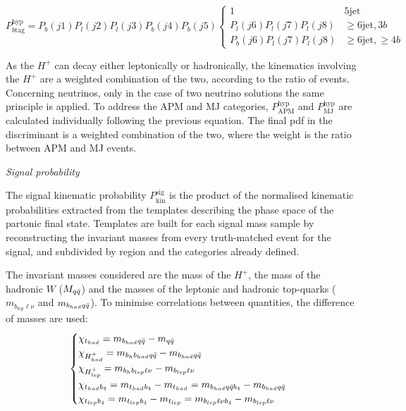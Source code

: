 \begin{equation}
    P^{\text{hyp}}_{b\text{tag}}=P_b(j1)P_l(j2)P_l(j3)P_b(j4)P_b(j5)\begin{cases}1&5\text{jet}\\P_l(j6)P_l(j7)P_l(j8)& \geq6\text{jet},3b\\P_b(j6)P_l(j7)P_l(j8)&\geq6\text{jet},\geq4b\end{cases}
\end{equation}

As the $H^+$ can decay either leptonically or hadronically, the kinematics involving the $H^+$ are a weighted combination of the two, according to the ratio of events. Concerning neutrinos, only in the case of two neutrino solutions the same principle is applied. To address the APM and MJ categories, $P^{\text{hyp}}_{\text{APM}}$ and $P^{\text{hyp}}_{\text{MJ}}$ are calculated individually following the previous equation. The final pdf in the discriminant is a weighted combination of the two, where the weight is the ratio between APM and MJ events.


\textit{Signal probability}

The signal kinematic probability $P^{\text{sig}}_{\text{kin}}$ is the product of the normalised kinematic probabilities extracted from the templates describing the phase space of the partonic final state. Templates are built for each signal mass sample by reconstructing the invariant masses from every truth-matched event for the signal, and subdivided by region and the categories already defined.

The invariant masses considered are the mass of the $H^+$, the mass of the hadronic $W$ ($M_{q\Bar{q}}$) and the masses of the leptonic and hadronic top-quarks ($m_{b_{lep}\ell\nu}$ and $m_{b_{had}q\Bar{q}}$). To minimise correlations between quantities, the difference of masses are used:
\begin{equation}
    \begin{cases} \chi_{t_{had}}=m_{b_{had}q\Bar{q}}-m_{q\Bar{q}} \\ 
    \chi_{H^+_{had}}=m_{b_hb_{had}q\Bar{q}}-m_{b_{had}q\Bar{q}} \\
    \chi_{H^+_{lep}}=m_{b_hb_{lep}\ell\nu}-m_{b_{lep}\ell\nu}\\
    \chi_{t_{had}b_4}=m_{t_{had}b_4}-m_{t_{had}}=m_{b_{had}q\bar{q}b_4}-m_{b_{had}q\bar{q}}\\
    \chi_{t_{lep}b_4}=m_{t_{lep}b_4}-m_{t_{lep}}=m_{b_{lep}\ell\nu b_4}-m_{b_{lep}\ell\nu}\\
    \end{cases} 
\end{equation}

